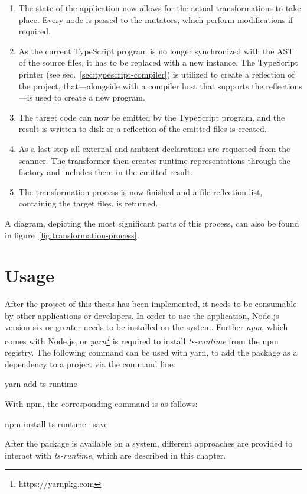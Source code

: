 \begin{enumerate}
  \item The state of the application now allows for the actual transformations to take place. Every node is passed to the mutators, which perform modifications if required.
  \item As the current TypeScript program is no longer synchronized with the AST of the source files, it has to be replaced with a new instance. The TypeScript printer (see sec.~\ref{sec:typescript-compiler}) is utilized to create a reflection of the project, that---alongside with a compiler host that supports the reflections---is used to create a new program.
  \item The target code can now be emitted by the TypeScript program, and the result is written to disk or a reflection of the emitted files is created.
  \item As a last step all external and ambient declarations are requested from the scanner. The transformer then creates runtime representations through the factory and includes them in the emitted result.
  \item The transformation process is now finished and a file reflection list, containing the target files, is returned.
\end{enumerate}
A diagram, depicting the most significant parts of this process, can also be found in figure~\ref{fig:transformation-process}.

\section{Usage}
\label{sec:usage}

After the project of this thesis has been implemented, it needs to be consumable by other applications or developers. In order to use the application, Node.js version six or greater needs to be installed on the system. Further \emph{npm}, which comes with Node.js, or \emph{yarn\footnote{https://yarnpkg.com}} is required to install \emph{ts-runtime} from the npm registry. The following command can be used with yarn, to add the package as a dependency to a project via the command line:
\begin{GenericCode}[numbers=none]
yarn add ts-runtime
\end{GenericCode}
With npm, the corresponding command is as follows:
\begin{GenericCode}[numbers=none]
npm install ts-runtime --save
\end{GenericCode}
After the package is available on a system, different approaches are provided to interact with \emph{ts-runtime}, which are described in this chapter.

